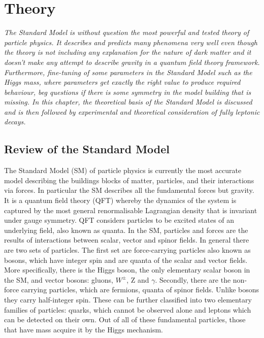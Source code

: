 \chapter{Theory}
\textit{The Standard Model is without question the most powerful and tested theory of particle physics. It describes and predicts many phenomena very well even though the theory is not including any explanation for the nature of dark matter and it doesn't make any attempt to describe gravity in a quantum field theory framework. Furthermore, fine-tuning of some parameters in the Standard Model such as the Higgs mass, where parameters get exactly the right value to produce required behaviour, beg questions if there is some symmetry in the model building that is missing. In this chapter, the theoretical basis of the Standard Model is discussed and is then followed by experimental and theoretical consideration of fully leptonic decays.}



\section{Review of the Standard Model}
The Standard Model (\gls{SM}) of particle physics is currently the most accurate model describing the buildings blocks of matter, particles, and their interactions via forces. In particular the \gls{SM} describes all the fundamental forces but gravity. It is a quantum field theory (\gls{QFT}) whereby the dynamics of the system is captured by the most general renormalisable Lagrangian density that is invariant under gauge symmetry. \gls{QFT} considers particles to be excited states of an underlying field, also known as quanta. In the \gls{SM}, particles and forces are the results of interactions between scalar, vector and spinor fields. In general there are two sets of particles. The first set are force-carrying particles also known as bosons, which have integer spin and are quanta of the scalar and vector fields. More specifically, there is the Higgs boson, the only elementary scalar boson in the \gls{SM}, and vector bosons: gluons, $W^{\pm}$, Z and $\gamma$. Secondly, there are the non-force carrying particles, which are fermions, quanta of spinor fields. Unlike bosons they carry half-integer spin. These can be further classified into two elementary families of particles: quarks, which cannot be observed alone and leptons which can be detected on their own. Out of all of these fundamental particles, those that have mass acquire it by the Higgs mechanism.


